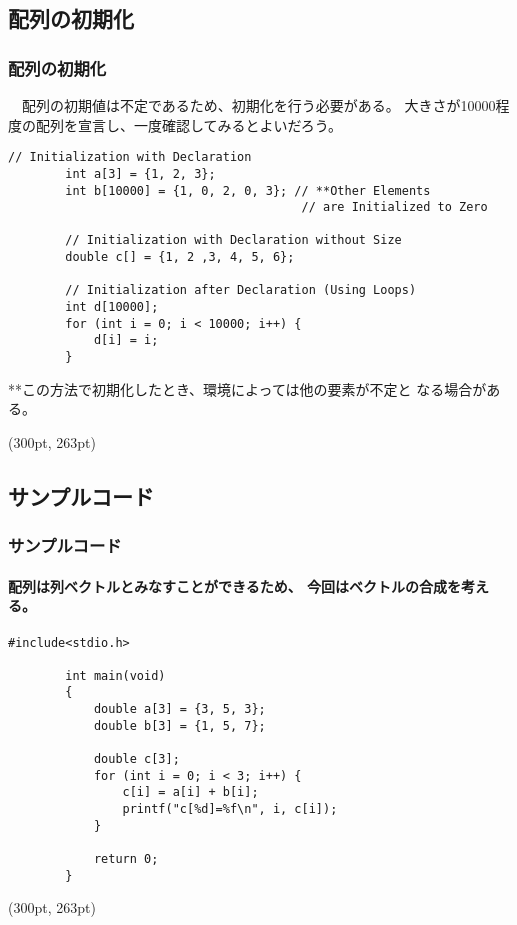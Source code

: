 \documentclass[dvipdfmx]{beamer}
\begin{document}
\subsection{配列の初期化}
\begin{frame}[t, fragile, label=59]
    \frametitle{配列の初期化}
    　配列の初期値は不定であるため、初期化を行う必要がある。
    大きさが10000程度の配列を宣言し、一度確認してみるとよいだろう。
    \begin{lstlisting}[gobble=8, caption=Example\space of\space Array\space\space Initialization]
        // Initialization with Declaration
        int a[3] = {1, 2, 3};
        int b[10000] = {1, 0, 2, 0, 3}; // **Other Elements  
                                         // are Initialized to Zero
        
        // Initialization with Declaration without Size
        double c[] = {1, 2 ,3, 4, 5, 6};

        // Initialization after Declaration (Using Loops)
        int d[10000];
        for (int i = 0; i < 10000; i++) {
            d[i] = i;
        }
    \end{lstlisting}
    **\space この方法で初期化したとき、環境によっては他の要素が不定と
    なる場合がある。
    \begin{textblock*}{0.3\linewidth}(300pt, 263pt)
        \hyperlink{58}{}
        \space
        \hyperlink{60}{}
    \end{textblock*}
\end{frame}

\subsection{サンプルコード}
\begin{frame}[t, fragile, label=60]
    \frametitle{サンプルコード}
    \framesubtitle{配列は列ベクトルとみなすことができるため、
    今回はベクトルの合成を考える。}
    \begin{lstlisting}[gobble=8, caption=pra\_array.c]
        #include<stdio.h>

        int main(void) 
        {
            double a[3] = {3, 5, 3};
            double b[3] = {1, 5, 7};

            double c[3];
            for (int i = 0; i < 3; i++) {
                c[i] = a[i] + b[i];
                printf("c[%d]=%f\n", i, c[i]);
            }
            
            return 0;
        }
    \end{lstlisting}
    \begin{textblock*}{0.3\linewidth}(300pt, 263pt)
        \hyperlink{59}{}
        \space
        \hyperlink{61}{}
    \end{textblock*}
\end{frame}
\end{document}
